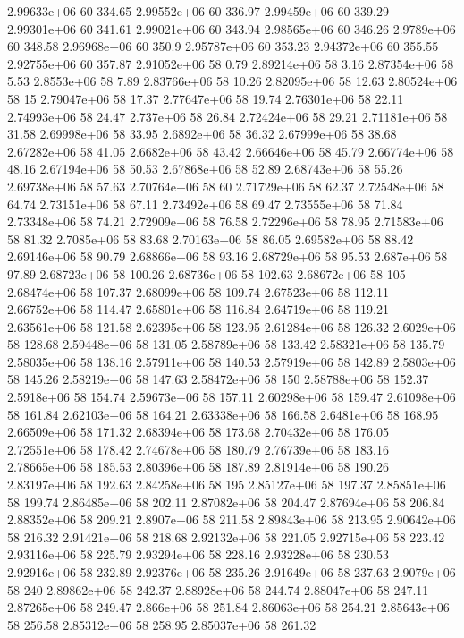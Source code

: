 2.99633e+06 60 334.65
2.99552e+06 60 336.97
2.99459e+06 60 339.29
2.99301e+06 60 341.61
2.99021e+06 60 343.94
2.98565e+06 60 346.26
2.9789e+06 60 348.58
2.96968e+06 60 350.9
2.95787e+06 60 353.23
2.94372e+06 60 355.55
2.92755e+06 60 357.87
2.91052e+06 58 0.79
2.89214e+06 58 3.16
2.87354e+06 58 5.53
2.8553e+06 58 7.89
2.83766e+06 58 10.26
2.82095e+06 58 12.63
2.80524e+06 58 15
2.79047e+06 58 17.37
2.77647e+06 58 19.74
2.76301e+06 58 22.11
2.74993e+06 58 24.47
2.737e+06 58 26.84
2.72424e+06 58 29.21
2.71181e+06 58 31.58
2.69998e+06 58 33.95
2.6892e+06 58 36.32
2.67999e+06 58 38.68
2.67282e+06 58 41.05
2.6682e+06 58 43.42
2.66646e+06 58 45.79
2.66774e+06 58 48.16
2.67194e+06 58 50.53
2.67868e+06 58 52.89
2.68743e+06 58 55.26
2.69738e+06 58 57.63
2.70764e+06 58 60
2.71729e+06 58 62.37
2.72548e+06 58 64.74
2.73151e+06 58 67.11
2.73492e+06 58 69.47
2.73555e+06 58 71.84
2.73348e+06 58 74.21
2.72909e+06 58 76.58
2.72296e+06 58 78.95
2.71583e+06 58 81.32
2.7085e+06 58 83.68
2.70163e+06 58 86.05
2.69582e+06 58 88.42
2.69146e+06 58 90.79
2.68866e+06 58 93.16
2.68729e+06 58 95.53
2.687e+06 58 97.89
2.68723e+06 58 100.26
2.68736e+06 58 102.63
2.68672e+06 58 105
2.68474e+06 58 107.37
2.68099e+06 58 109.74
2.67523e+06 58 112.11
2.66752e+06 58 114.47
2.65801e+06 58 116.84
2.64719e+06 58 119.21
2.63561e+06 58 121.58
2.62395e+06 58 123.95
2.61284e+06 58 126.32
2.6029e+06 58 128.68
2.59448e+06 58 131.05
2.58789e+06 58 133.42
2.58321e+06 58 135.79
2.58035e+06 58 138.16
2.57911e+06 58 140.53
2.57919e+06 58 142.89
2.5803e+06 58 145.26
2.58219e+06 58 147.63
2.58472e+06 58 150
2.58788e+06 58 152.37
2.5918e+06 58 154.74
2.59673e+06 58 157.11
2.60298e+06 58 159.47
2.61098e+06 58 161.84
2.62103e+06 58 164.21
2.63338e+06 58 166.58
2.6481e+06 58 168.95
2.66509e+06 58 171.32
2.68394e+06 58 173.68
2.70432e+06 58 176.05
2.72551e+06 58 178.42
2.74678e+06 58 180.79
2.76739e+06 58 183.16
2.78665e+06 58 185.53
2.80396e+06 58 187.89
2.81914e+06 58 190.26
2.83197e+06 58 192.63
2.84258e+06 58 195
2.85127e+06 58 197.37
2.85851e+06 58 199.74
2.86485e+06 58 202.11
2.87082e+06 58 204.47
2.87694e+06 58 206.84
2.88352e+06 58 209.21
2.8907e+06 58 211.58
2.89843e+06 58 213.95
2.90642e+06 58 216.32
2.91421e+06 58 218.68
2.92132e+06 58 221.05
2.92715e+06 58 223.42
2.93116e+06 58 225.79
2.93294e+06 58 228.16
2.93228e+06 58 230.53
2.92916e+06 58 232.89
2.92376e+06 58 235.26
2.91649e+06 58 237.63
2.9079e+06 58 240
2.89862e+06 58 242.37
2.88928e+06 58 244.74
2.88047e+06 58 247.11
2.87265e+06 58 249.47
2.866e+06 58 251.84
2.86063e+06 58 254.21
2.85643e+06 58 256.58
2.85312e+06 58 258.95
2.85037e+06 58 261.32
